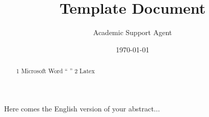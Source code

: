 \documentclass{article}
\title{Template Document}
\author{Academic Support Agent}
\date{\today}
\begin{document}
\maketitle

%  
\coverpage

%  
\begin{abstract}
 1 Microsoft Word `` '' 2 Latex  
\keywords{ {\LaTeX} }     %
\end{abstract}

%  
\begin{abstractEN}
Here comes the English version of your abstract...
\end{abstractEN}

%  
\contentpage




\begin{references}
    
\end{references}



%
\end{document}
